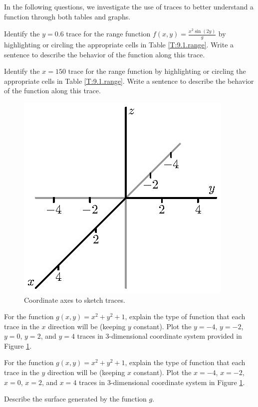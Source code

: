 \begin{activity} \label{A:9.1.6}
    In the following questions, we investigate the use of traces to better understand a function through both tables and graphs.  
    \ba
  \item Identify the $y = 0.6$ trace for the range function $f(x,y) =
    \frac{x^2 \sin(2y)}{g}$ by highlighting or circling the
    appropriate cells in Table \ref{T:9.1.range}.  Write a sentence to
    describe the behavior of the function along this trace.

  \item Identify the $x = 150$ trace for the range function by
    highlighting or circling the appropriate cells in Table
    \ref{T:9.1.range}.  Write a sentence to describe the behavior of
    the function along this trace.

 \begin{figure}[ht]
\begin{center}
  \includegraphics{figures/fig_9_1_activity_axes.eps}
\caption{Coordinate axes to sketch traces.}
\label{F:9.1.traces_activity_1}
\end{center}
\end{figure}

   \item For the function $g(x,y) = x^2 + y^2 + 1$, explain the type of function that each trace in the $x$ direction will be (keeping $y$ constant). Plot the $y=-4$, $y=-2$, $y=0$, $y=2$, and $y=4$ traces in 3-dimensional coordinate system provided in Figure \ref{F:9.1.traces_activity_1}.

    \item For the function $g(x,y) = x^2 + y^2 + 1$, explain the type of function that each trace in the $y$ direction will be (keeping $x$ constant). Plot the $x=-4$, $x=-2$, $x=0$, $x=2$, and $x=4$ traces in 3-dimensional coordinate system in Figure \ref{F:9.1.traces_activity_1}.

    \item Describe the surface generated by the function $g$.

     \ea



\end{activity}
